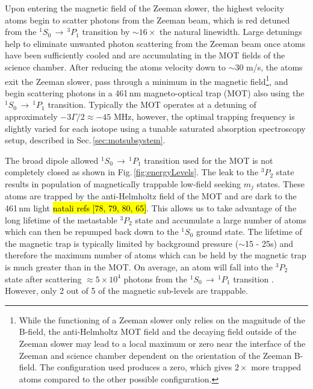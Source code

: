 Upon entering the magnetic field of the Zeeman slower, the highest velocity atoms begin to scatter photons from the Zeeman beam, which is red detuned from the $^1S_0\,\rightarrow\,^3P_1$ transition by $\sim\!16\times$ the natural linewidth.
Large detunings help to eliminate unwanted photon scattering from the Zeeman beam once atoms have been sufficiently cooled and are accumulating in the MOT fields of the science chamber. 
After reducing the atoms velocity down to $\sim$30 m/s, the atoms exit the Zeeman slower, pass through a minimum in the magnetic field\footnote{
While the functioning of a Zeeman slower only relies on the magnitude of the B-field, the anti-Helmholtz MOT field and the decaying field outside of the Zeeman slower may lead to a local maximum or zero near the interface of the Zeeman and science chamber dependent on the orientation of the Zeeman B-field.
The configuration used produces a zero, which gives $2\times$ more trapped atoms compared to the other possible configuration.}, and begin scattering photons in a 461\,nm magneto-optical trap (MOT) also using the $^1S_0\,\rightarrow\,^1P_1$ transition. 
Typically the MOT operates at a detuning of approximately $-3\Gamma/2 \approx -45$ MHz, however, the optimal trapping frequency is slightly varied for each isotope using a tunable saturated absorption spectroscopy setup, described in Sec.\,\ref{sec:motsubsystem}. 

The broad dipole allowed $^1S_0\,\rightarrow\,^1P_1$ transition used for the MOT 
is not completely closed as shown in Fig.\,\ref{fig:energyLevels}.
The leak to the $^3P_2$ state results in population of magnetically trappable low-field seeking $m_j$ states. 
These atoms are trapped by the anti-Helmholtz field of the MOT and are dark to the 461\,nm light \hl{natali refs [78, 79, 80, 65]}.
This allows us to take advantage of the long lifetime of the metastable $^3P_2$ state and accumulate a large number of atoms which can then be repumped back down to the $^1S_0$ ground state.
The lifetime of the magnetic trap is typically limited by background pressure ($\sim$15 - 25s) and therefore the maximum number of atoms which can be held by the magnetic trap is much greater than in the MOT.
On average, an atom will fall into the $^3P_2$ state after scattering $\approx5\times10^4$ photons from the $^1S_0\,\rightarrow\,^1P_1$ transition \cite{Cooper2018}.
However, only 2 out of 5 of the magnetic sub-levels are trappable.

